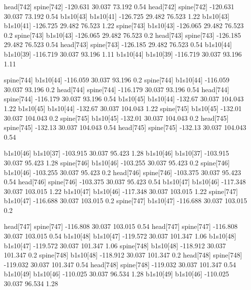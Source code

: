 head[742]    spine[742]    -120.631    30.037    73.192    0.54
head[742]    spine[742]    -120.631    30.037    73.192    0.54
b1s10[43]    b1s10[41]    -126.725    29.482    76.523    1.22
b1s10[43]    b1s10[41]    -126.725    29.482    76.523    1.22
spine[743]    b1s10[43]    -126.065    29.482    76.523    0.2
spine[743]    b1s10[43]    -126.065    29.482    76.523    0.2
head[743]    spine[743]    -126.185    29.482    76.523    0.54
head[743]    spine[743]    -126.185    29.482    76.523    0.54
b1s10[44]    b1s10[39]    -116.719    30.037    93.196    1.11
b1s10[44]    b1s10[39]    -116.719    30.037    93.196    1.11


spine[744]    b1s10[44]    -116.059    30.037    93.196    0.2
spine[744]    b1s10[44]    -116.059    30.037    93.196    0.2
head[744]    spine[744]    -116.179    30.037    93.196    0.54
head[744]    spine[744]    -116.179    30.037    93.196    0.54
b1s10[45]    b1s10[44]    -132.67    30.037    104.043    1.22
b1s10[45]    b1s10[44]    -132.67    30.037    104.043    1.22
spine[745]    b1s10[45]    -132.01    30.037    104.043    0.2
spine[745]    b1s10[45]    -132.01    30.037    104.043    0.2
head[745]    spine[745]    -132.13    30.037    104.043    0.54
head[745]    spine[745]    -132.13    30.037    104.043    0.54


b1s10[46]    b1s10[37]    -103.915    30.037    95.423    1.28
b1s10[46]    b1s10[37]    -103.915    30.037    95.423    1.28
spine[746]    b1s10[46]    -103.255    30.037    95.423    0.2
spine[746]    b1s10[46]    -103.255    30.037    95.423    0.2
head[746]    spine[746]    -103.375    30.037    95.423    0.54
head[746]    spine[746]    -103.375    30.037    95.423    0.54
b1s10[47]    b1s10[46]    -117.348    30.037    103.015    1.22
b1s10[47]    b1s10[46]    -117.348    30.037    103.015    1.22
spine[747]    b1s10[47]    -116.688    30.037    103.015    0.2
spine[747]    b1s10[47]    -116.688    30.037    103.015    0.2


head[747]    spine[747]    -116.808    30.037    103.015    0.54
head[747]    spine[747]    -116.808    30.037    103.015    0.54
b1s10[48]    b1s10[47]    -119.572    30.037    101.347    1.06
b1s10[48]    b1s10[47]    -119.572    30.037    101.347    1.06
spine[748]    b1s10[48]    -118.912    30.037    101.347    0.2
spine[748]    b1s10[48]    -118.912    30.037    101.347    0.2
head[748]    spine[748]    -119.032    30.037    101.347    0.54
head[748]    spine[748]    -119.032    30.037    101.347    0.54
b1s10[49]    b1s10[46]    -110.025    30.037    96.534    1.28
b1s10[49]    b1s10[46]    -110.025    30.037    96.534    1.28


